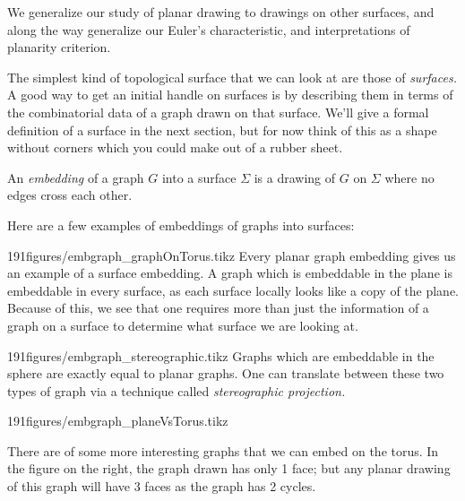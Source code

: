 
\begin{elevator}
We generalize our study of planar drawing to drawings on other surfaces, and along the way generalize our Euler's characteristic, and interpretations of planarity criterion. 
\label{sec:planar:surfaces}
\end{elevator}
The simplest kind of topological surface that we can look at are those of \emph{surfaces.} A good way to get an initial handle on surfaces is by describing them in terms of the combinatorial data of a graph drawn on that surface. We'll give a formal definition of a surface in the next section, but for now think of this as a shape without corners which you could make out of a rubber sheet.
\begin{definition}
An \emph{embedding} of a graph $G$ into a surface $\Sigma$ is a drawing of $G$ on $\Sigma$ where no edges cross  each other. 
\end{definition}
Here are a few examples of embeddings of graphs into surfaces:

\begin{examplefigureenv}{191figures/embgraph_graphOnTorus.tikz}
	Every planar graph embedding gives us an example of a surface embedding. A graph which is embeddable in the plane is embeddable in every surface, as each surface locally looks like a copy of the plane. Because of this, we see that one requires more than just the information of a graph on a surface to determine what surface we are looking at. 
\end{examplefigureenv}



\begin{examplefigureenv}{191figures/embgraph_stereographic.tikz}
	Graphs which are embeddable in the sphere are exactly equal to planar graphs. One can translate between these two types of graph via a technique called \emph{stereographic projection.}
\end{examplefigureenv}

\begin{examplefigureenv}{191figures/embgraph_planeVsTorus.tikz}
	
There are of some more interesting graphs that we can embed on the torus. In the figure on the right, the graph drawn has only 1 face; but any planar drawing of this graph will have 3 faces as the graph has 2 cycles. 
\end{examplefigureenv}

